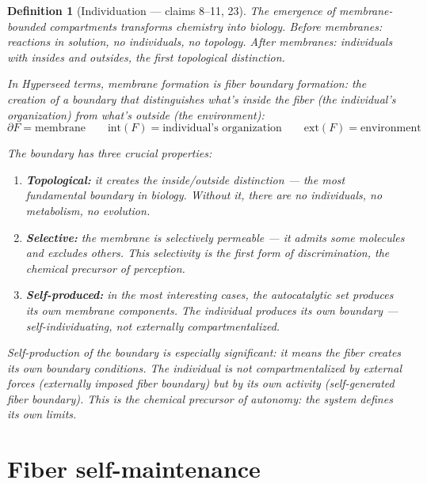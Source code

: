 \documentclass[11pt,a4paper]{article}
\newtheorem{definition}{Definition}[section]
\begin{document}
\begin{definition}[Individuation --- claims 8--11, 23]
\label{def:boundary}
The emergence of membrane-bounded compartments transforms chemistry
into biology. Before membranes: reactions in solution, no individuals,
no topology. After membranes: individuals with insides and outsides,
the first topological distinction.

In Hyperseed terms, membrane formation is \emph{fiber boundary
formation}: the creation of a boundary that distinguishes what's
inside the fiber (the individual's organization) from what's outside
(the environment):
\[
  \partial F = \text{membrane} \qquad
  \text{int}(F) = \text{individual's organization} \qquad
  \text{ext}(F) = \text{environment}
\]

The boundary has three crucial properties:
\begin{enumerate}
\item \textbf{Topological:} it creates the inside/outside distinction
  --- the most fundamental boundary in biology. Without it, there
  are no individuals, no metabolism, no evolution.
\item \textbf{Selective:} the membrane is selectively permeable ---
  it admits some molecules and excludes others. This selectivity is
  the first form of discrimination, the chemical precursor of
  perception.
\item \textbf{Self-produced:} in the most interesting cases, the
  autocatalytic set produces its own membrane components. The
  individual produces its own boundary --- self-individuating,
  not externally compartmentalized.
\end{enumerate}

Self-production of the boundary is especially significant: it means
the fiber creates its own boundary conditions. The individual is not
compartmentalized by external forces (externally imposed fiber
boundary) but by its own activity (self-generated fiber boundary).
This is the chemical precursor of autonomy: the system defines its
own limits.
\end{definition}

\section{Fiber self-maintenance}
\label{sec:maintenance}
\end{document}
